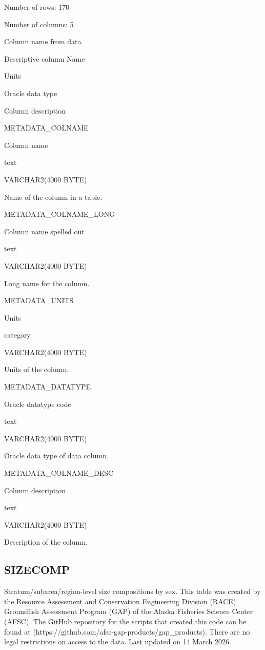 \documentclass[
  letterpaper,
  oneside,
  open=any]{scrbook}
\begin{document}
Number of rows: 170

Number of columns: 5

Column name from data

Descriptive column Name

Units

Oracle data type

Column description

METADATA\_COLNAME

Column name

text

VARCHAR2(4000 BYTE)

Name of the column in a table.

METADATA\_COLNAME\_LONG

Column name spelled out

text

VARCHAR2(4000 BYTE)

Long name for the column.

METADATA\_UNITS

Units

category

VARCHAR2(4000 BYTE)

Units of the column.

METADATA\_DATATYPE

Oracle datatype code

text

VARCHAR2(4000 BYTE)

Oracle data type of data column.

METADATA\_COLNAME\_DESC

Column description

text

VARCHAR2(4000 BYTE)

Description of the column.

\subsection{SIZECOMP}\label{sizecomp}

Stratum/subarea/region-level size compositions by sex. This table was
created by the Resource Assessment and Conservation Engineering Division
(RACE) Groundfish Assessment Program (GAP) of the Alaska Fisheries
Science Center (AFSC). The GitHub repository for the scripts that
created this code can be found at
(https://github.com/afsc-gap-products/gap\_products). There are no legal
restrictions on access to the data. Last updated on 14 March 2026.
\end{document}
